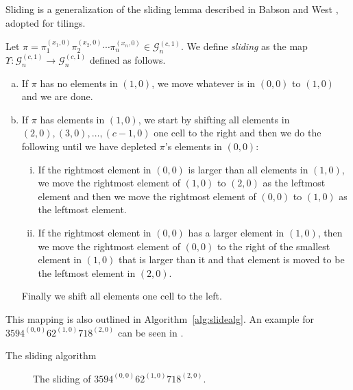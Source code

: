Sliding is a generalization of the sliding lemma described in Babson and West \cite{slide}, adopted for tilings.

\begin{definition}
Let $\pi = \pi_1^{(x_1,0)}\pi_2^{(x_2,0)}\cdots\pi_n^{(x_n,0)} \in \mathcal{G}^{(c,1)}_n$. We define \emph{sliding} as the map $\Upsilon: \mathcal{G}^{(c,1)}_n \to \mathcal{G}^{(c,1)}_n$ defined as follows.
\begin{enumerate}[a)]
    \item If $\pi$ has no elements in $(1,0)$, we move whatever is in $(0,0)$ to $(1,0)$ and we are done.
    \item If $\pi$ has elements in $(1,0)$, we start by shifting all elements in $(2,0), (3,0), \dotsc, (c-1,0)$ one cell to the right and then we do the following until we have depleted $\pi$'s elements in $(0,0)$:
    \begin{enumerate}[i.]
        \item If the rightmost element in $(0,0)$ is larger than all elements in $(1,0)$, we move the rightmost element of $(1,0)$ to $(2,0)$ as the leftmost element and then we move the rightmost element of $(0,0)$ to $(1,0)$ as the leftmost element.
        \item If the rightmost element in $(0,0)$ has a larger element in $(1,0)$, then we move the rightmost element of $(0,0)$ to the right of the smallest element in $(1,0)$ that is larger than it and that element is moved to be the leftmost element in $(2,0)$.
    \end{enumerate}
    Finally we shift all elements one cell to the left.
\end{enumerate}
\end{definition}

This mapping is also outlined in Algorithm~\ref{alg:slidealg}. An example for $3594^{(0,0)}62^{(1,0)}718^{(2,0)}$ can be seen in .

\begin{algorithm}

\caption{The sliding algorithm}
\label{alg:slidealg}
\end{algorithm}

\begin{figure}[ht!]
    \centering
    
    \caption{The sliding of $3594^{(0,0)}62^{(1,0)}718^{(2,0)}$.}
    \label{fig:slide_gp_example}
\end{figure}

